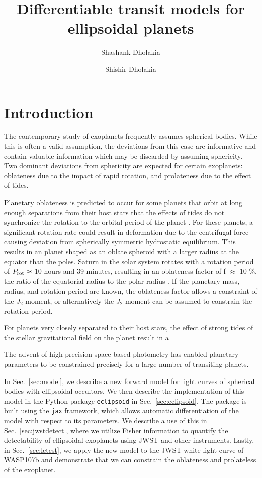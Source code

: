 \documentclass[twocolumn]{aastex631}
\begin{document}
\title{Differentiable transit models for ellipsoidal planets}

\author{Shashank Dholakia} \author{Shishir Dholakia}

\begin{abstract}

\end{abstract}

\section{Introduction} \label{sec:intro}
The contemporary study of exoplanets frequently assumes spherical bodies. While this is often a valid assumption, the deviations from this case are informative and contain valuable information which may be discarded by assuming sphericity. Two dominant deviations from sphericity are expected for certain exoplanets: oblateness due to the impact of rapid rotation, and prolateness due to the effect of tides.

Planetary oblateness is predicted to occur for some planets that orbit at long enough separations from their host stars that the effects of tides do not synchronize the rotation to the orbital period of the planet \citep{seager2002a}. For these planets, a significant rotation rate could result in deformation due to the centrifugal force causing deviation from spherically symmetric hydrostatic equilibrium. This results in an planet shaped as an oblate spheroid with a larger radius at the equator than the poles. Saturn in the solar system rotates with a rotation period of $P_{\rm rot} \approx $ 10 hours and 39 minutes, resulting in an oblateness factor of f $\approx$ 10 \%, the ratio of the equatorial radius to the polar radius \citep{davies1980}. If the planetary mass, radius, and rotation period are known, the oblateness factor allows a constraint of the $J_2$ moment, or alternatively the $J_2$ moment can be assumed to constrain the rotation period. 

For planets very closely separated to their host stars, the effect of strong tides of the stellar gravitational field on the planet result in a 


The advent of high-precision space-based photometry has enabled planetary parameters to be constrained precisely for a large number of transiting planets. 

In Sec.~\ref{sec:model}, we describe a new forward model for light curves of spherical bodies with ellipsoidal occultors. We then describe the implementation of this model in the Python package \texttt{eclipsoid} in Sec.~\ref{sec:eclipsoid}. The package is built using the \texttt{jax} framework, which allows automatic differentiation of the model with respect to its parameters. We describe a use of this in Sec.~\ref{sec:jwstdetect}, where we utilize Fisher information to quantify the detectability of ellipsoidal exoplanets using JWST and other instruments. Lastly, in Sec.~\ref{sec:lctest}, we apply the new model to the JWST white light curve of WASP107b and demonstrate that we can constrain the oblateness and prolateless of the exoplanet. 
\end{document}
